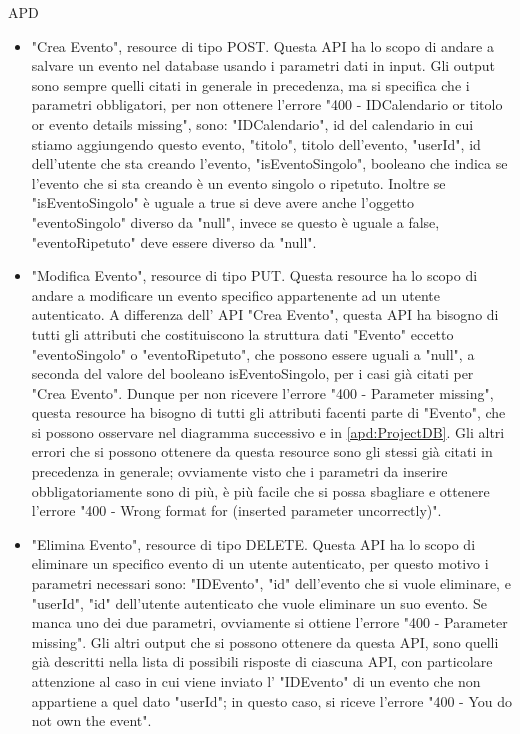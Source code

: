 \begin{listaPersonale} {APD}
\begin{listaPersonale2}[APD]{}
\begin{listaPersonale3}[APD]{}
            \begin{itemize}
                \item "Crea Evento", resource di tipo POST. Questa API ha lo scopo di andare a salvare un evento nel database usando i parametri dati in input. Gli output sono sempre quelli citati in generale in precedenza, ma si specifica che i parametri obbligatori, per non ottenere l'errore "400 - IDCalendario or titolo or evento details missing", sono: "IDCalendario", id del calendario in cui stiamo aggiungendo questo evento, "titolo", titolo dell'evento, "userId", id dell'utente che sta creando l'evento, "isEventoSingolo", booleano che indica se l'evento che si sta creando è un evento singolo o ripetuto. Inoltre se "isEventoSingolo" è uguale a true si deve avere anche l'oggetto "eventoSingolo" diverso da "null", invece se questo è uguale a false, "eventoRipetuto" deve essere diverso da "null".
                \item "Modifica Evento", resource di tipo PUT. Questa resource ha lo scopo di andare a modificare un evento specifico appartenente ad un utente autenticato. A differenza dell' API "Crea Evento", questa API ha bisogno di tutti gli attributi che costituiscono la struttura dati "Evento" eccetto "eventoSingolo" o "eventoRipetuto", che possono essere uguali a "null", a seconda del valore del booleano isEventoSingolo, per i casi già citati per "Crea Evento". Dunque per non ricevere l'errore "400 - Parameter missing", questa resource ha bisogno di tutti gli attributi facenti parte di "Evento", che si possono osservare nel diagramma successivo e in \ref{apd:ProjectDB}. Gli altri errori che si possono ottenere da questa resource sono gli stessi già citati in precedenza in generale; ovviamente visto che i parametri da inserire obbligatoriamente sono di più, è più facile che si possa sbagliare e ottenere l'errore "400 - Wrong format for (inserted parameter uncorrectly)".
                \item "Elimina Evento", resource di tipo DELETE. Questa API ha lo scopo di eliminare un specifico evento di un utente autenticato, per questo motivo i parametri necessari sono: "IDEvento", "id" dell'evento che si vuole eliminare, e "userId", "id" dell'utente autenticato che vuole eliminare un suo evento. Se manca uno dei due parametri, ovviamente si ottiene l'errore "400 - Parameter missing". Gli altri output che si possono ottenere da questa API, sono quelli già descritti nella lista di possibili risposte di ciascuna API, con particolare attenzione al caso in cui viene inviato l' "IDEvento" di un evento che non appartiene a quel dato "userId"; in questo caso, si riceve l'errore "400 - You do not own the event".

\end{itemize}
\end{listaPersonale3}
\end{listaPersonale2}
\end{listaPersonale}
